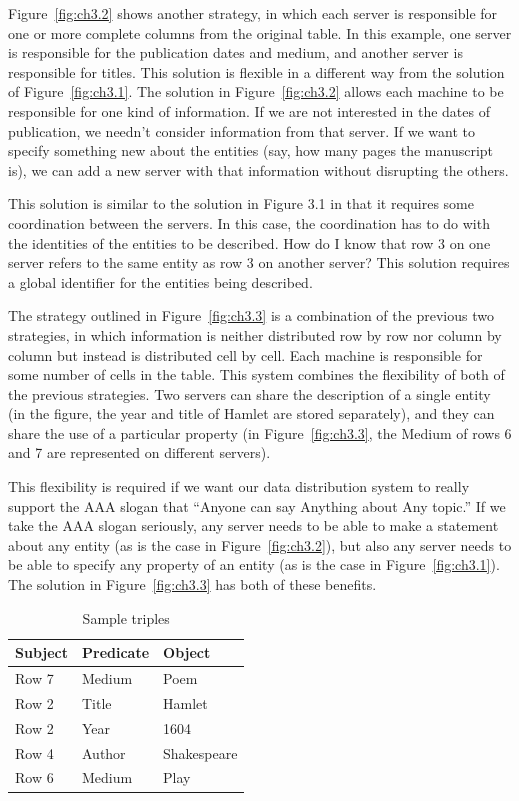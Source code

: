 Figure~\ref{fig:ch3.2} shows another strategy, in which each server is responsible
for one or more complete columns from the original table. In this
example, one server is responsible for the publication dates and medium,
and another server is responsible for titles. This solution is flexible
in a different way from the solution of Figure~\ref{fig:ch3.1}. The solution in
Figure~\ref{fig:ch3.2} allows each machine to be responsible for one kind of
information. If we are not interested in the dates of publication, we
needn't consider information from that server. If we want to specify
something new about the entities (say, how many pages the manuscript
is), we can add a new server with that information without disrupting
the others.

This solution is similar to the solution in Figure 3.1 in that it
requires some coordination between the servers. In this case, the
coordination has to do with the identities of the entities to be
described. How do I know that row 3 on one server refers to the same
entity as row 3 on another server? This solution requires a global
identifier for the entities being described.

The strategy outlined in Figure~\ref{fig:ch3.3} is a combination of the previous two
strategies, in which information is neither distributed row by row nor
column by column but instead is distributed cell by cell. Each machine
is responsible for some number of cells in the table. This system
combines the flexibility of both of the previous strategies. Two servers
can share the description of a single entity (in the figure, the year
and title of Hamlet are stored separately), and they can share the use
of a particular property (in Figure~\ref{fig:ch3.3}, the Medium of rows 6 and 7 are
represented on different servers).

This flexibility is required if we want our data distribution system to
really support the AAA slogan that ``Anyone can say Anything about Any topic.'' If we take the AAA
slogan seriously, any server needs to be able to make a statement about
any entity (as is the case in Figure~\ref{fig:ch3.2}), but also any server needs to
be able to specify any property of an entity (as is the case in Figure~\ref{fig:ch3.1}). The solution in Figure~\ref{fig:ch3.3} has both of these benefits.


\begin{table}[h]
\centering
\begin{tabular}{||l l l||} 
 \hline
Subject&Predicate&Object \\ [0.5ex] 
 \hline\hline
Row 7&Medium&Poem \\
Row 2&Title&Hamlet \\
Row 2&Year&1604\\
Row 4&Author&Shakespeare\\
Row 6&Medium&Play\\

\hline
\end{tabular}
\caption{Sample triples}
\label{tab:ch3.2}
\end{table}





